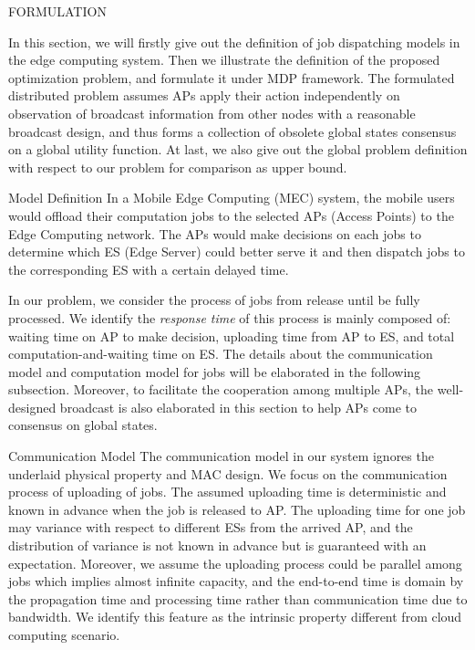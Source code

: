 \documentclass[10pt, conference, letterpaper]{IEEEtran}
\begin{document}
    \begin{section}{FORMULATION}
        \label{sec:formulation}

        In this section, we will firstly give out the definition of job dispatching models in the edge computing system. Then we illustrate the definition of the proposed optimization problem, and formulate it under MDP framework. The formulated distributed problem assumes APs apply their action independently on observation of broadcast information from other nodes with a reasonable broadcast design, and thus forms a collection of obsolete global states consensus on a global utility function. At last, we also give out the global problem definition with respect to our problem for comparison as upper bound.

        \begin{subsection}{Model Definition}
            In a Mobile Edge Computing (MEC) system, the mobile users would offload their computation jobs to the selected APs (Access Points) to the Edge Computing network. The APs would make decisions on each jobs to determine which ES (Edge Server) could better serve it and then dispatch jobs to the corresponding ES with a certain delayed time.
            
            In our problem, we consider the process of jobs from release until be fully processed. We identify the \emph{response time} of this process is mainly composed of: waiting time on AP to make decision, uploading time from AP to ES, and total computation-and-waiting time on ES.
            The details about the communication model and computation model for jobs will be elaborated in the following subsection. Moreover, to facilitate the cooperation among multiple APs, the well-designed broadcast is also elaborated in this section to help APs come to consensus on global states.
            
            \begin{subsubsection}{Communication Model}
                The communication model in our system ignores the underlaid physical property and MAC design. We focus on the communication process of uploading of jobs.
                The assumed uploading time is deterministic and known in advance when the job is released to AP. The uploading time for one job may variance with respect to different ESs from the arrived AP, and the distribution of variance is not known in advance but is guaranteed with an expectation.
                Moreover, we assume the uploading process could be parallel among jobs which implies almost infinite capacity, and the end-to-end time is domain by the propagation time and processing time rather than communication time due to bandwidth. We identify this feature as the intrinsic property different from cloud computing scenario.
                

\end{subsubsection}
\end{subsection}
\end{section}
\end{document}

